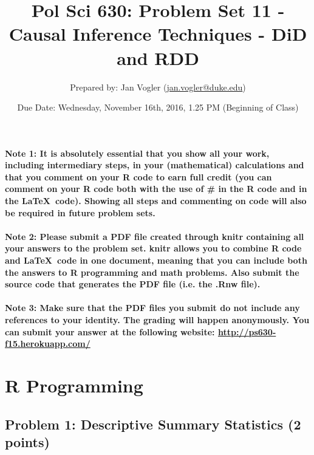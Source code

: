 \documentclass[12pt]{article}
\begin{document}
\title{Pol Sci 630: Problem Set 11 - Causal Inference Techniques - DiD and RDD}

\author{Prepared by: Jan Vogler (\href{mailto:jan.vogler@duke.edu}{jan.vogler@duke.edu})}

\date{Due Date: Wednesday, November 16th, 2016, 1.25 PM (Beginning of Class)}
 
\maketitle 



\paragraph{Note 1: It is absolutely essential that you show all your work, including intermediary steps, in your (mathematical) calculations and that you comment on your R code to earn full credit (you can comment on your R code both with the use of \# in the R code and in the \LaTeX \ code). Showing all steps and commenting on code will also be required in future problem sets.}

\paragraph{Note 2: Please submit a PDF file created through knitr containing all your answers to the problem set. knitr allows you to combine R code and \LaTeX \ code in one document, meaning that you can include both the answers to R programming and math problems. Also submit the source code that generates the PDF file (i.e. the .Rnw file).}

\paragraph{Note 3: Make sure that the PDF files you submit do not include any references to your identity. The grading will happen anonymously. You can submit your answer at the following website: \url{http://ps630-f15.herokuapp.com/}}



\section*{R Programming}

\subsection*{Problem 1: Descriptive Summary Statistics (2 points)}
\end{document}
